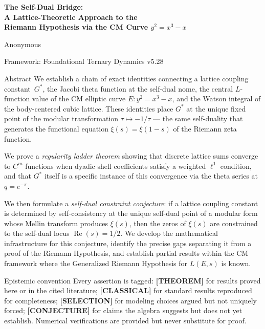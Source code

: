 \documentclass[11pt]{article}
\theoremstyle{tight}
\theoremstyle{plainroman}
\begin{document}
\begin{titlepage}
\centering
\vspace*{1.8cm}
{\fontsize{21}{26}\selectfont\bfseries\color{accent}
The Self-Dual Bridge:\\[0.3em]
A Lattice-Theoretic Approach to the\\[0.3em]
Riemann Hypothesis via the CM Curve $y^2=x^3-x$\par}
\vspace{0.8cm}
{\large Anonymous\par}
\vspace{0.3cm}
{\normalsize Framework: Foundational Ternary Dynamics v5.28\par}
\vspace{1.2cm}
\begin{minipage}{0.86\textwidth}
\begin{statusbox}{Abstract}
We establish a chain of exact identities connecting a lattice coupling constant~$G^*$, the Jacobi theta function at the self-dual nome, the central $L$-function value of the CM elliptic curve $E:y^2=x^3-x$, and the Watson integral of the body-centered cubic lattice.
These identities place $G^*$ at the unique fixed point of the modular transformation $\tau\mapsto -1/\tau$ --- the same self-duality that generates the functional equation $\xi(s)=\xi(1-s)$ of the Riemann zeta function.

We prove a \emph{regularity ladder theorem} showing that discrete lattice sums converge to $C^m$ functions when dyadic shell coefficients satisfy a weighted $\ell^1$ condition, and that $G^*$ itself is a specific instance of this convergence via the theta series at $q=e^{-\pi}$.

We then formulate a \emph{self-dual constraint conjecture}: if a lattice coupling constant is determined by self-consistency at the unique self-dual point of a modular form whose Mellin transform produces $\xi(s)$, then the zeros of $\xi(s)$ are constrained to the self-dual locus $\operatorname{Re}(s)=1/2$.
We develop the mathematical infrastructure for this conjecture, identify the precise gaps separating it from a proof of the Riemann Hypothesis, and establish partial results within the CM framework where the Generalized Riemann Hypothesis for $L(E,s)$ is known.
\end{statusbox}
\end{minipage}
\vfill
\end{titlepage}
\tableofcontents
\thispagestyle{empty}
\clearpage

\begin{statusbox}{Epistemic convention}
Every assertion is tagged: \textbf{[THEOREM]} for results proved here or in the cited literature; \textbf{[CLASSICAL]} for standard results reproduced for completeness; \textbf{[SELECTION]} for modeling choices argued but not uniquely forced; \textbf{[CONJECTURE]} for claims the algebra suggests but does not yet establish.
Numerical verifications are provided but never substitute for proof.
\end{statusbox}
\end{document}
